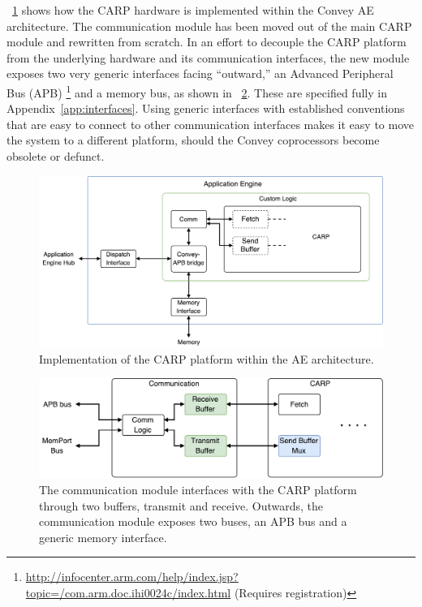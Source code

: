 \figurename~\ref{fig:convey-io-carp-overivew} shows how the CARP hardware is
implemented within the Convey AE architecture. The communication module has been
moved out of the main CARP module and rewritten from scratch. In an effort to
decouple the CARP platform from the underlying hardware and its communication
interfaces, the new module exposes two very generic interfaces facing
``outward,'' an Advanced Peripheral Bus (APB)
\footnote{\url{http://infocenter.arm.com/help/index.jsp?topic=/com.arm.doc.ihi0024c/index.html}
(Requires registration)} and a memory bus, as shown in
\figurename~\ref{fig:comm-io}. These are specified fully in
Appendix~\ref{app:interfaces}. Using generic interfaces with established
conventions that are easy to connect to other communication interfaces makes it
easy to move the system to a different platform, should the Convey coprocessors
become obsolete or defunct.

\begin{figure}[ht]
  \centering
  \includegraphics[width=\linewidth]{fig/convey-io-carp-overview}
  \caption{Implementation of the CARP platform within the AE architecture.}
  \label{fig:convey-io-carp-overivew}
\end{figure}

\begin{figure}[ht]
  \centering
  \includegraphics[width=0.8\linewidth]{fig/comm-io}
  \caption{
    The communication module interfaces with the CARP platform through two
    buffers, transmit and receive. Outwards, the communication module exposes two
    buses, an APB bus and a generic memory interface.
  }
  \label{fig:comm-io}
\end{figure}


